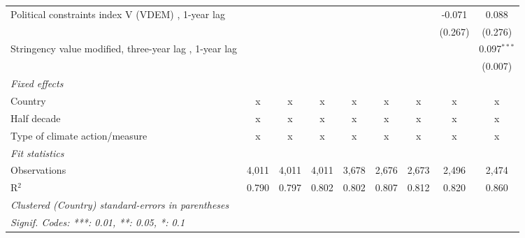 \begin{table}[htbp]
\begin{tabular}{lcccccccc}
      Political constraints index V (VDEM) , 1-year lag                                                   &                &                &                &                &               &               & -0.071        & 0.088\\   
                                                                                                          &                &                &                &                &               &               & (0.267)       & (0.276)\\   
      Stringency value modified, three-year lag , 1-year lag                                              &                &                &                &                &               &               &               & 0.097$^{***}$\\   
                                                                                                          &                &                &                &                &               &               &               & (0.007)\\   
      \emph{Fixed effects}\\
      Country                                                                                             & x              & x              & x              & x              & x             & x             & x             & x\\  
      Half decade                                                                                         & x              & x              & x              & x              & x             & x             & x             & x\\  
      Type of climate action/measure                                                                      & x              & x              & x              & x              & x             & x             & x             & x\\  
      \midrule \emph{Fit statistics}\\
      Observations                                                                                        & 4,011          & 4,011          & 4,011          & 3,678          & 2,676         & 2,673         & 2,496         & 2,474\\  
      R$^2$                                                                                               & 0.790          & 0.797          & 0.802          & 0.802          & 0.807         & 0.812         & 0.820         & 0.860\\  
      \midrule
      \multicolumn{9}{l}{\emph{Clustered (Country) standard-errors in parentheses}}\\
      \multicolumn{9}{l}{\emph{Signif. Codes: ***: 0.01, **: 0.05, *: 0.1}}\\
   \end{tabular}
\end{table}


